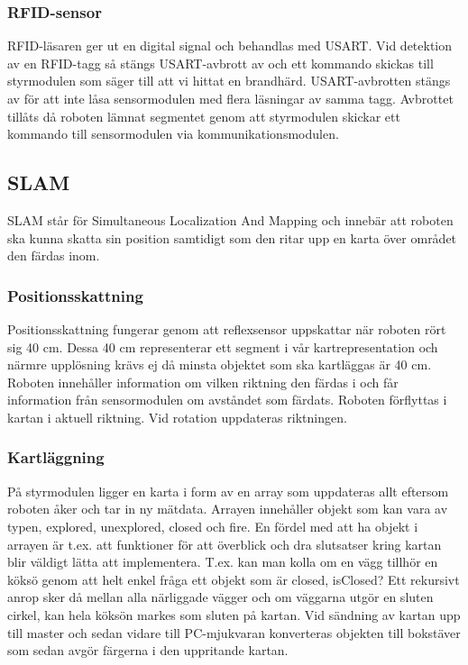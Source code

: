 \documentclass[a4paper,12pt,fleqn]{article}
\begin{document}
\subsubsection{RFID-sensor}

RFID-läsaren ger ut en digital signal och behandlas med USART. Vid detektion av en RFID-tagg så stängs USART-avbrott av och ett kommando skickas till styrmodulen som säger till att vi hittat en brandhärd. 
USART-avbrotten stängs av för att inte låsa sensormodulen med flera läsningar av samma tagg. Avbrottet tillåts då roboten lämnat segmentet genom att styrmodulen skickar ett kommando till sensormodulen via kommunikationsmodulen.

\subsection{SLAM}

SLAM står för Simultaneous Localization And Mapping och innebär att roboten ska kunna skatta sin position samtidigt som den ritar upp en karta över området den färdas inom.

\subsubsection{Positionsskattning}
Positionsskattning fungerar genom att reflexsensor uppskattar när roboten rört sig 40 cm. Dessa 40 cm representerar ett segment i vår kartrepresentation och närmre upplösning krävs ej då minsta objektet som ska kartläggas är 40 cm. Roboten innehåller information om vilken riktning den färdas i och får information från sensormodulen om avståndet som färdats. Roboten förflyttas i kartan i aktuell riktning. Vid rotation uppdateras riktningen. 

\subsubsection{Kartläggning}
På styrmodulen ligger en karta i form av en array som uppdateras allt eftersom roboten åker och tar in ny mätdata. Arrayen innehåller objekt som kan vara av typen, explored, unexplored, closed och fire. En fördel med att ha objekt i arrayen är t.ex. att funktioner för att överblick och dra slutsatser kring kartan blir väldigt lätta att implementera. T.ex. kan man kolla om en vägg tillhör en köksö genom att helt enkel fråga ett objekt som är closed, isClosed? Ett rekursivt anrop sker då mellan alla närliggade vägger och om väggarna utgör en sluten cirkel, kan hela köksön markes som sluten på kartan. 
Vid sändning av kartan upp till master och sedan vidare till PC-mjukvaran konverteras objekten till bokstäver som sedan avgör färgerna i den uppritande kartan.  
\end{document}
